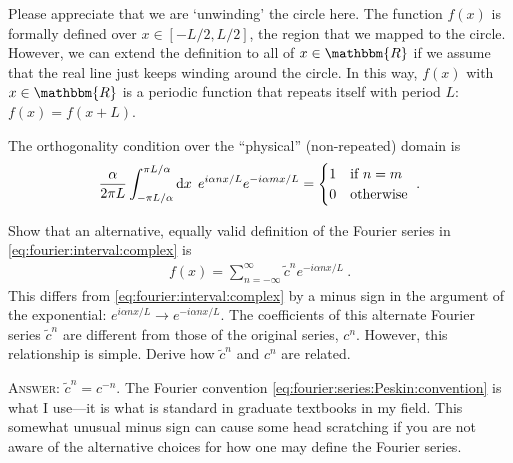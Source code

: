 \begin{exercise}
Please appreciate that we are `unwinding' the circle here. The function $f(x)$ is formally defined over $x\in[-L/2,L/2]$, the region that we mapped to the circle. However, we can extend the definition to all of $x\in \mathbbm{R}$ if we assume that the real line just keeps winding around the circle. In this way, $f(x)$ with $x\in \mathbbm{R}$ is a periodic function that repeats itself with period $L$: $f(x) = f(x+L)$.
\end{exercise}

\noindent
The orthogonality condition over the ``physical'' (non-repeated) domain is 
\begin{align}
    \frac{\alpha}{2\pi L} \int_{-\pi L/\alpha}^{\pi L/\alpha} \operatorname{d}\mkern-3mu^{}\mkern-1mu{x}\,\;
    e^{i\alpha n x/L}
    e^{-i\alpha m x/L}
    =
    \begin{cases}
    1 &\textnormal{if } n=m\\
    0 &\textnormal{otherwise} 
    \end{cases}
    \ .
\end{align}


\begin{exercise}\label{ex:Fourier:using:Peskin:exponential:sign:convention}
Show that an alternative, equally valid definition of the Fourier series in \eqref{eq:fourier:interval:complex} is
\begin{align}
    f(x) = \sum_{n=-\infty}^\infty \tilde c^n e^{-i\alpha n x/L} \ .
    \label{eq:fourier:series:Peskin:convention}
\end{align}
This differs from \eqref{eq:fourier:interval:complex} by a minus sign in the argument of the exponential: $e^{i\alpha nx/L} \to e^{-i\alpha nx/L}$. The coefficients of this alternate Fourier series $\tilde c^n$ are different from those of the original series, $c^n$. However, this relationship is simple. Derive how $\tilde c^n$ and $c^n$ are related.

\textsc{Answer}: $\tilde c^n = c^{-n}$. The Fourier convention \eqref{eq:fourier:series:Peskin:convention} is what I use---it is what is standard in graduate textbooks in my field. This somewhat unusual minus sign can cause some head scratching if you are not aware of the alternative choices for how one may define the Fourier series.
\end{exercise}


